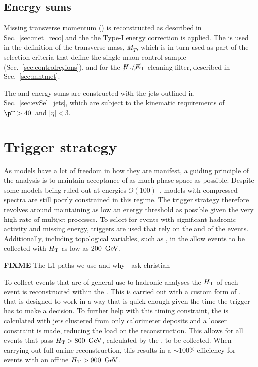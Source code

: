 \subsection{Energy sums}

Missing transverse momentum (\MET) is reconstructed as described in
Sec.~\ref{sec:met_reco} and the the Type-I \MET energy correction is applied.
The \met is used in the definition of 
the transverse mass, $M_{T}$, which is in turn used as part of
the selection criteria that define the single muon control sample 
(Sec.~\ref{sec:controlregions}), and for the $\mhtmet$ cleaning
filter, described in Sec.~\ref{sec:mhtmet}.

The \HT and \MHT energy sums are constructed with the jets outlined in
Sec.~\ref{sec:evSel_jets}, which are subject to the kinematic requirements of
$\pT>40$~\gev and $|\eta|<3$.

\section{Trigger strategy}

As \SUSY models have a lot of freedom in how they are manifest, a
guiding principle of the analysis is to maintain acceptance of as much
phase space as possible. Despite some \SUSY models being ruled out at
energies $O(100)$~\gev, models with compressed spectra are still poorly
constrained in this regime. The trigger strategy therefore revolves
around maintaining as low an energy threshold as possible given the
very high rate of \QCD multijet processes. To select for events with
significant hadronic activity and missing energy, triggers are used
that rely on the \HT and \MHT of the events. Additionally, including
topological variables, such as \alphat, in the \HLT allow events to be
collected with $\mbox{$H_\text{T}$}$ as low as $200~\mathrm{\,Ge\kern -0.1em V}$.

{\bf FIXME} The L1 paths we use and why - ask christian

To collect events that are of general use to hadronic analyses the
$\mbox{$H_\text{T}$}$ of each event is reconstructed within the \HLT. This is carried
out with a custom form of \PF, that is designed to work in a way that
is quick enough given the time the trigger has to make a decision. To
further help with this timing constraint, the \HT is calculated with
jets clustered from only calorimeter deposits and a looser constraint
is made, reducing the load on the \PF reconstruction. This allows for
all events that pass $\mbox{$H_\text{T}$}>800~\mathrm{\,Ge\kern -0.1em V}$, calculated by the \HLT,
to be collected. When carrying out full online reconstruction, this
results in a $\sim 100\%$ efficiency for events with an offline
$\mbox{$H_\text{T}$}>900~\mathrm{\,Ge\kern -0.1em V}$. 

